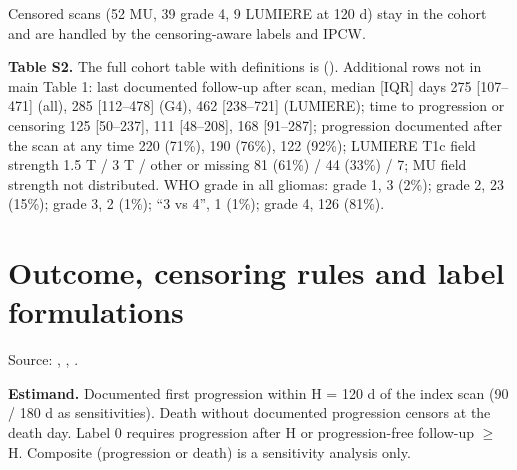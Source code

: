 \documentclass[11pt,a4paper]{article}
\begin{document}
Censored scans (52 MU, 39 grade 4, 9 LUMIERE at 120 d) stay in the cohort and are handled by the
censoring-aware labels and IPCW.

\textbf{Table S2.} The full cohort table with definitions is
(). Additional rows not in main Table 1: last documented follow-up after scan, median [IQR]
days 275 [107--471] (all), 285 [112--478] (G4), 462 [238--721] (LUMIERE); time to progression or censoring 125
[50--237], 111 [48--208], 168 [91--287]; progression documented after the scan at any time 220 (71\%), 190
(76\%), 122 (92\%); LUMIERE T1c field strength 1.5 T / 3 T / other or missing 81 (61\%) / 44 (33\%) / 7; MU
field strength not distributed. WHO grade in all gliomas: grade 1, 3 (2\%); grade 2, 23 (15\%); grade 3, 2
(1\%); ``3 vs 4'', 1 (1\%); grade 4, 126 (81\%).

\FloatBarrier
\section{Outcome, censoring rules and label formulations}\label{sec:S3}

Source: ,
,
.

\textbf{Estimand.} Documented first progression within H = 120 d of the index scan (90 / 180 d as
sensitivities). Death without documented progression censors at the death day. Label 0 requires progression
after H or progression-free follow-up $\geq$ H. Composite (progression or death) is a sensitivity analysis
only.
\end{document}
